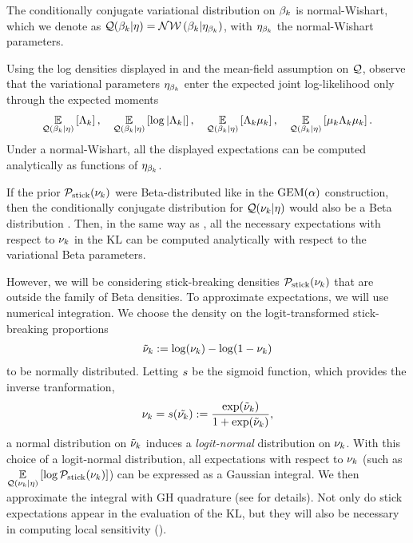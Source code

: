 \begin{ex}
%
The conditionally conjugate variational distribution on $\beta_k$ is
normal-Wishart, which we denote as
$\mathcal{Q}(\beta_k \vert \eta) = \mathcal{N}\mathcal{W}\left(\beta_k \vert \eta_{\beta_k}\right)$,
with $\eta_{\beta_k}$ the normal-Wishart parameters.

Using the log densities displayed in 
and the mean-field assumption on $\mathcal{Q}$,
observe that the variational parameters $\eta_{\beta_k}$
enter the expected joint log-likelihood only through the
expected moments
%
\begin{align*}
\underset{\mathcal{Q}(\beta_k \vert \eta)}{\mathbb{E}}\left[\Lambda_k\right],  \quad
\underset{\mathcal{Q}(\beta_k \vert \eta)}{\mathbb{E}}\left[\log|\Lambda_k|\right],  \quad
\underset{\mathcal{Q}(\beta_k \vert \eta)}{\mathbb{E}}\left[\Lambda_k\mu_k\right], \quad
\underset{\mathcal{Q}(\beta_k \vert \eta)}{\mathbb{E}}\left[\mu_k\Lambda_k\mu_k\right].
\end{align*}
Under a normal-Wishart, all the displayed expectations
can be computed analytically as functions of $\eta_{\beta_k}$.
%
\end{ex}

If the prior $\mathcal{P}_{\mathrm{stick}}(\nu_{k})$ were Beta-distributed like in the $\mathrm{GEM}(\alpha)$
construction, then the conditionally conjugate distribution for $\mathcal{Q}(\nu_{k} \vert
\eta)$ would also be a Beta distribution \citep{blei:2006:vi_for_dp}. Then, in
the same way as , all the necessary expectations with
respect to $\nu_{k}$ in the $\mathrm{KL}$ can be computed analytically with respect
to the variational Beta parameters.

However, we will be considering stick-breaking densities $\mathcal{P}_{\mathrm{stick}}(\nu_{k})$
that are outside the family of Beta densities. To approximate expectations,
we will use numerical integration. We choose the density on the
logit-transformed stick-breaking proportions
%
\begin{align*}
  \tilde{\nu}_k := \log(\nu_k) - \log(1 - \nu_k)
\end{align*}
%
to be normally distributed. Letting $s$ be the sigmoid function,
which provides the inverse tranformation,
%
\begin{align*}
    \nu_{k} = s(\tilde{\nu_{k}}) := \frac{\exp(\tilde{\nu}_k)}{1 + \exp(\tilde{\nu}_k)},
\end{align*}
%
a normal distribution on $\tilde{\nu}_k$ induces a \textit{logit-normal} distribution
on $\nu_{k}$. With this choice of a logit-normal distribution, all expectations
with respect to $\nu_k$ (such as $\underset{\mathcal{Q}(\nu_k\vert\eta)}{\mathbb{E}}\left[\log
\mathcal{P}_{\mathrm{stick}}(\nu_k)\right]$) can be expressed as a Gaussian integral. We then approximate
the integral with GH quadrature (see  for details). Not
only do stick expectations appear in the evaluation of the $\mathrm{KL}$, but
they will also be necessary in computing local sensitivity
().


